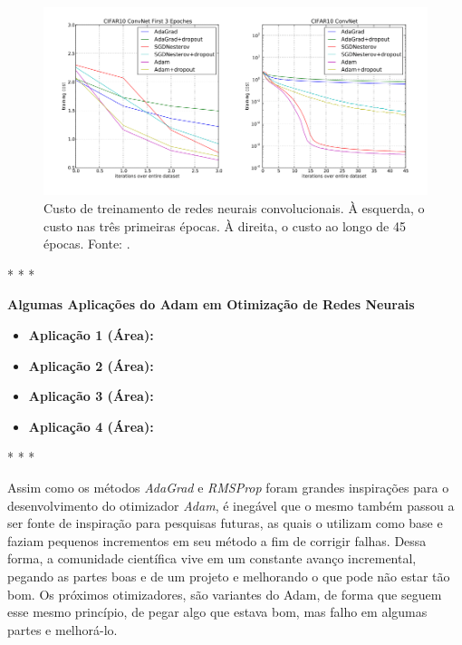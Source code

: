\begin{figure}[h]
    \centering
    \includegraphics[width=0.85\linewidth]{../imagens/retropropagacao-gradiente/comparativo-adam-convnet.png}
    
    \caption[Custo de treinamento de redes neurais convolucionais]{%
        Custo de treinamento de redes neurais convolucionais. À esquerda, o custo nas três primeiras épocas. À direita, o custo ao longo de 45 épocas.
        \newline
        \small Fonte: \parencite{AdamMethod}.
    }
    \label{fig:comparativo-adam-convnet}
\end{figure}

\medskip
\begin{center}
 * * *
\end{center}
\medskip

\textbf{Algumas Aplicações do Adam em Otimização de Redes Neurais}
\vspace{1em}

\begin{itemize}
    \item \textbf{Aplicação 1 (Área):}
    \item \textbf{Aplicação 2 (Área):}
    \item \textbf{Aplicação 3 (Área):}
    \item \textbf{Aplicação 4 (Área):}
\end{itemize}

\medskip
\begin{center}
 * * *
\end{center}
\medskip

Assim como os métodos \textit{AdaGrad} e \textit{RMSProp} foram grandes inspirações para o desenvolvimento do otimizador \textit{Adam}, é inegável que o mesmo também passou a ser fonte de inspiração para pesquisas futuras, as quais o utilizam como base e faziam pequenos incrementos em seu método a fim de corrigir falhas. Dessa forma, a comunidade científica vive em um constante avanço incremental, pegando as partes boas e de um projeto e melhorando o que pode não estar tão bom. Os próximos otimizadores, são variantes do Adam, de forma que seguem esse mesmo princípio, de pegar algo que estava bom, mas falho em algumas partes e melhorá-lo.

